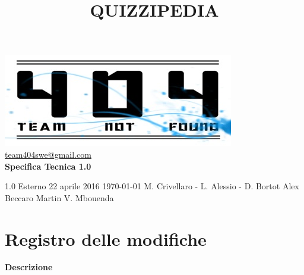 \documentclass[a4paper,11pt]{article}
\title{\textbf{{\fontsize{8mm}{5mm}\selectfont QUIZZIPEDIA}}}
\date{}
\author{}
\begin{document}
	\maketitle
	\thispagestyle{empty}
	\begin{center}	
	\includegraphics{../team_not_found.jpg}\\
	\fontsize{5mm}{3mm}\url{team404swe@gmail.com}\\
	
	\vspace{50mm}
	\textbf{Specifica Tecnica 1.0}
	\end{center}
			{1.0} 							%
			{Esterno} 						%
			{22 aprile 2016} 				%
			{\today} 						%
			{M. Crivellaro - L. Alessio - D. Bortot}	%
			{Alex Beccaro } 			%
			{Martin V. Mbouenda} 				%
	\newpage
	\thispagestyle{empty}
	\null  

	\newpage
	\newpage
	\fancyfoot[R]{\thepage}
	
	\hspace{30 mm}
	\section*{Registro delle modifiche}
	
	\beginregistro
	
			 {\hspace{5 mm} 
	\textbf{Descrizione}}
\end{document}
